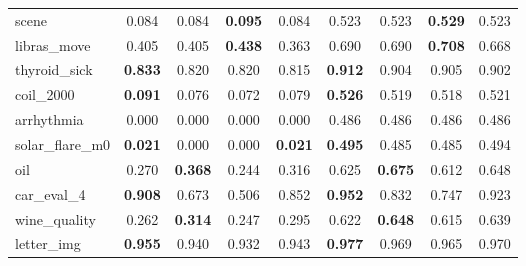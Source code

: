 \begin{figure}[ht]
\begin{tabular}{p{22mm}|*4{p{14mm}}|*4{p{14mm}}}
        scene&\multicolumn{1}{c}{0.084}&\multicolumn{1}{c}{0.084}&\multicolumn{1}{c}{\textbf{0.095}}&\multicolumn{1}{c|}{0.084}&\multicolumn{1}{c}{0.523}&\multicolumn{1}{c}{0.523}&\multicolumn{1}{c}{\textbf{0.529}}&\multicolumn{1}{c}{0.523}\\
        libras\_move&\multicolumn{1}{c}{0.405}&\multicolumn{1}{c}{0.405}&\multicolumn{1}{c}{\textbf{0.438}}&\multicolumn{1}{c|}{0.363}&\multicolumn{1}{c}{0.690}&\multicolumn{1}{c}{0.690}&\multicolumn{1}{c}{\textbf{0.708}}&\multicolumn{1}{c}{0.668}\\
        thyroid\_sick&\multicolumn{1}{c}{\textbf{0.833}}&\multicolumn{1}{c}{0.820}&\multicolumn{1}{c}{0.820}&\multicolumn{1}{c|}{0.815}&\multicolumn{1}{c}{\textbf{0.912}}&\multicolumn{1}{c}{0.904}&\multicolumn{1}{c}{0.905}&\multicolumn{1}{c}{0.902}\\
        coil\_2000&\multicolumn{1}{c}{\textbf{0.091}}&\multicolumn{1}{c}{0.076}&\multicolumn{1}{c}{0.072}&\multicolumn{1}{c|}{0.079}&\multicolumn{1}{c}{\textbf{0.526}}&\multicolumn{1}{c}{0.519}&\multicolumn{1}{c}{0.518}&\multicolumn{1}{c}{0.521}\\
        arrhythmia&\multicolumn{1}{c}{0.000}&\multicolumn{1}{c}{0.000}&\multicolumn{1}{c}{0.000}&\multicolumn{1}{c|}{0.000}&\multicolumn{1}{c}{0.486}&\multicolumn{1}{c}{0.486}&\multicolumn{1}{c}{0.486}&\multicolumn{1}{c}{0.486}\\
        solar\_flare\_m0&\multicolumn{1}{c}{\textbf{0.021}}&\multicolumn{1}{c}{0.000}&\multicolumn{1}{c}{0.000}&\multicolumn{1}{c|}{\textbf{0.021}}&\multicolumn{1}{c}{\textbf{0.495}}&\multicolumn{1}{c}{0.485}&\multicolumn{1}{c}{0.485}&\multicolumn{1}{c}{0.494}\\
        oil&\multicolumn{1}{c}{0.270}&\multicolumn{1}{c}{\textbf{0.368}}&\multicolumn{1}{c}{0.244}&\multicolumn{1}{c|}{0.316}&\multicolumn{1}{c}{0.625}&\multicolumn{1}{c}{\textbf{0.675}}&\multicolumn{1}{c}{0.612}&\multicolumn{1}{c}{0.648}\\
        car\_eval\_4&\multicolumn{1}{c}{\textbf{0.908}}&\multicolumn{1}{c}{0.673}&\multicolumn{1}{c}{0.506}&\multicolumn{1}{c|}{0.852}&\multicolumn{1}{c}{\textbf{0.952}}&\multicolumn{1}{c}{0.832}&\multicolumn{1}{c}{0.747}&\multicolumn{1}{c}{0.923}\\
        wine\_quality&\multicolumn{1}{c}{0.262}&\multicolumn{1}{c}{\textbf{0.314}}&\multicolumn{1}{c}{0.247}&\multicolumn{1}{c|}{0.295}&\multicolumn{1}{c}{0.622}&\multicolumn{1}{c}{\textbf{0.648}}&\multicolumn{1}{c}{0.615}&\multicolumn{1}{c}{0.639}\\
        letter\_img&\multicolumn{1}{c}{\textbf{0.955}}&\multicolumn{1}{c}{0.940}&\multicolumn{1}{c}{0.932}&\multicolumn{1}{c|}{0.943}&\multicolumn{1}{c}{\textbf{0.977}}&\multicolumn{1}{c}{0.969}&\multicolumn{1}{c}{0.965}&\multicolumn{1}{c}{0.970}\\

\end{tabular}
\end{figure}
